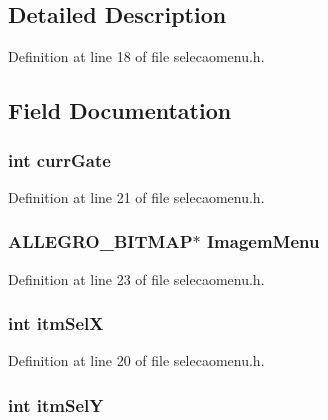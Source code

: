 \subsection{Detailed Description}


Definition at line 18 of file selecaomenu.\-h.



\subsection{Field Documentation}
\hypertarget{structlg_images_a2c7659050a9602d2f1d03ba7ba5e1ab1}{
\subsubsection[{curr\-Gate}]{\setlength{\rightskip}{0pt plus 5cm}int curr\-Gate}}\label{structlg_images_a2c7659050a9602d2f1d03ba7ba5e1ab1}


Definition at line 21 of file selecaomenu.\-h.

\hypertarget{structlg_images_a1dd6f6bab3c44a483fd6b0ec167bef6e}{
\subsubsection[{Imagem\-Menu}]{\setlength{\rightskip}{0pt plus 5cm}A\-L\-L\-E\-G\-R\-O\-\_\-\-B\-I\-T\-M\-A\-P$\ast$ Imagem\-Menu}}\label{structlg_images_a1dd6f6bab3c44a483fd6b0ec167bef6e}


Definition at line 23 of file selecaomenu.\-h.

\hypertarget{structlg_images_a80e20539c9ee783d1b94d9ff45b84285}{
\subsubsection[{itm\-Sel\-X}]{\setlength{\rightskip}{0pt plus 5cm}int itm\-Sel\-X}}\label{structlg_images_a80e20539c9ee783d1b94d9ff45b84285}


Definition at line 20 of file selecaomenu.\-h.

\hypertarget{structlg_images_a419148a94eb987b22532c4cafda281f3}{
\subsubsection[{itm\-Sel\-Y}]{\setlength{\rightskip}{0pt plus 5cm}int itm\-Sel\-Y}}\label{structlg_images_a419148a94eb987b22532c4cafda281f3}


